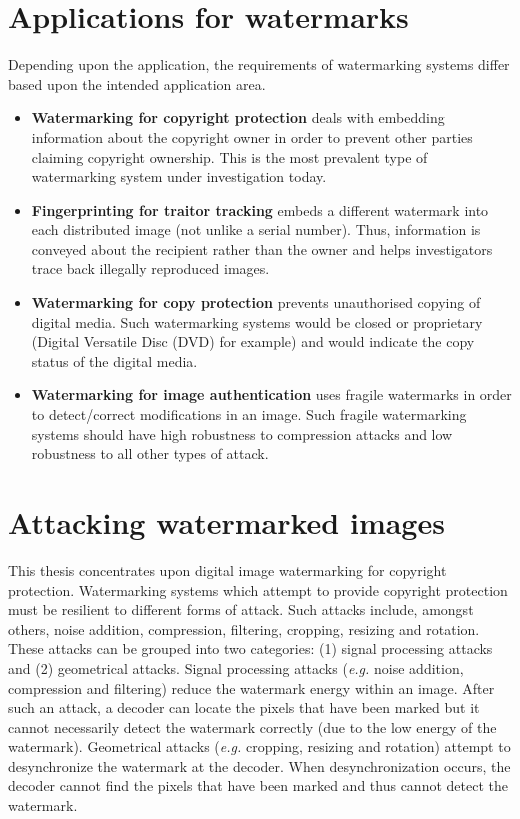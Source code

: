 \documentclass[12pt]{report}
\begin{document}
\section{Applications for watermarks}
Depending upon the application, the requirements of watermarking systems differ based upon the
intended application area. 
\begin{itemize}
	\item {\bf Watermarking for copyright protection} deals with embedding information about 
	the copyright owner in order to prevent other parties claiming copyright ownership. This
	is the most prevalent type of watermarking system under investigation today.

	\item {\bf Fingerprinting for traitor tracking} embeds a different watermark into 
	each distributed image (not unlike a serial number). Thus, information is conveyed
	about the recipient rather than the owner and helps investigators trace back
	illegally reproduced images.

	\item {\bf Watermarking for copy protection} prevents unauthorised copying of 
	digital media. Such watermarking systems would be closed or proprietary (Digital Versatile Disc (DVD) for example)
	and would indicate the copy status of the digital media.

	\item {\bf Watermarking for image authentication} uses fragile watermarks in order to 
	detect/correct modifications in an image. Such fragile watermarking systems should have
	high robustness to compression attacks and low robustness to all other types of attack.
\end{itemize}

\section{Attacking watermarked images}
\label{sec:wmatt}
This thesis concentrates upon digital image watermarking for copyright protection.
Watermarking systems which attempt to provide copyright protection must be resilient
to different forms of attack. Such attacks include, amongst others, noise addition, compression, filtering,
cropping, resizing and rotation. 
These attacks can be grouped into two categories: (1) signal processing
attacks and (2) geometrical attacks. Signal processing attacks (\emph{e.g.} noise addition,
compression and filtering) reduce the
watermark energy within an image. After such an attack, a decoder can locate
the pixels that have been marked but it cannot necessarily detect the watermark correctly
(due to the low energy of the watermark).
Geometrical attacks (\emph{e.g.} cropping, resizing and rotation) attempt to desynchronize
the watermark at the decoder. When desynchronization occurs, the decoder cannot find the
pixels that have been marked and thus cannot detect the watermark.
\end{document}

